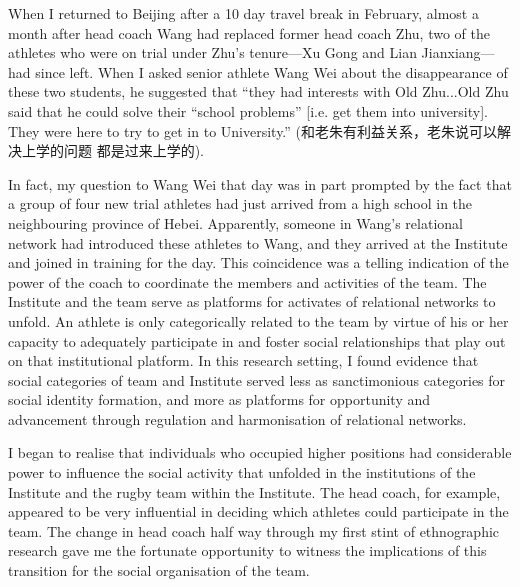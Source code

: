 \begin{CJK}{UTF8}{gbsn}
When I returned to Beijing after a 10 day travel break in February, almost a month after head coach Wang had replaced former head coach Zhu, two of the athletes who were on trial under Zhu's tenure---Xu Gong and Lian Jianxiang---had since left.  When I asked senior athlete Wang Wei about the disappearance of these two students, he suggested that ``they had interests with Old Zhu...Old Zhu said that he could solve their ``school problems'' [i.e. get them into university]. They were here to try to get in to University.'' (和老朱有利益关系，老朱说可以解决上学的问题 都是过来上学的).

In fact, my question to Wang Wei that day was in part prompted by the fact that a group of four new trial athletes had just arrived from a high school in the neighbouring province of Hebei.  Apparently, someone in Wang's relational network had introduced these athletes to Wang, and they arrived at the Institute and joined in training for the day.  This coincidence was a telling indication of the power of the coach to coordinate the members and activities of the team.  The Institute and the team serve as platforms for activates of relational networks to unfold.  An athlete is only categorically related to the team by virtue of his or her capacity to adequately participate in and foster social relationships that play out on that institutional platform.  In this research setting, I found evidence that social categories of team and Institute served less as sanctimonious categories for social identity formation, and more as platforms for opportunity and advancement through regulation and harmonisation of relational networks.

I began to realise that individuals who occupied higher positions had considerable power to influence the social activity that unfolded in the institutions of the Institute and the rugby team within the Institute.   The head coach, for example, appeared to be very influential in deciding which athletes could participate in the team.  The change in head coach half way through my first stint of ethnographic research gave me the fortunate opportunity to witness the implications of this transition for the social organisation of the team.



\end{CJK}
